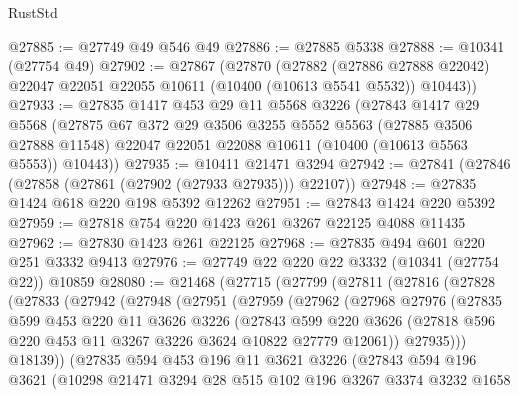 \begin{lexlean}{RustStd}
\begin{coremodule}
@27885 := @27749 @49 @546 @49
@27886 := @27885 @5338
@27888 := @10341 (@27754 @49)
@27902 := @27867
    (@27870
      (@27882
        (@27886 @27888 @22042)
        @22047
        @22051
        @22055
        @10611
        (@10400 (@10613 @5541 @5532))
        @10443))
@27933 := @27835
    @1417
    @453
    @29
    @11
    @5568
    @3226
    (@27843
      @1417
      @29
      @5568
      (@27875
        @67
        @372
        @29
        @3506
        @3255
        @5552
        @5563
        (@27885 @3506 @27888 @11548)
        @22047
        @22051
        @22088
        @10611
        (@10400 (@10613 @5563 @5553))
        @10443))
@27935 := @10411 @21471 @3294
@27942 := @27841 (@27846 (@27858 (@27861 (@27902 (@27933 @27935))) @22107))
@27948 := @27835 @1424 @618 @220 @198 @5392 @12262
@27951 := @27843 @1424 @220 @5392
@27959 := @27818 @754 @220 @1423 @261 @3267 @22125 @4088 @11435
@27962 := @27830 @1423 @261 @22125
@27968 := @27835 @494 @601 @220 @251 @3332 @9413
@27976 := @27749 @22 @220 @22 @3332 (@10341 (@27754 @22)) @10859
@28080 := @21468
    (@27715
      (@27799
        (@27811
          (@27816
            (@27828
              (@27833
                (@27942
                  (@27948
                    (@27951
                      (@27959
                        (@27962
                          (@27968
                            @27976
                            (@27835
                              @599
                              @453
                              @220
                              @11
                              @3626
                              @3226
                              (@27843
                                @599
                                @220
                                @3626
                                (@27818 @596 @220 @453 @11 @3267 @3226 @3624 @10822 @27779 @12061))
                              @27935)))
                        @18139))
                    (@27835
                      @594
                      @453
                      @196
                      @11
                      @3621
                      @3226
                      (@27843
                        @594
                        @196
                        @3621
                        (@10298
                          @21471
                          @3294
                          @28
                          @515
                          @102
                          @196
                          @3267
                          @3374
                          @3232
                          @1658

\end{coremodule}
\end{lexlean}
